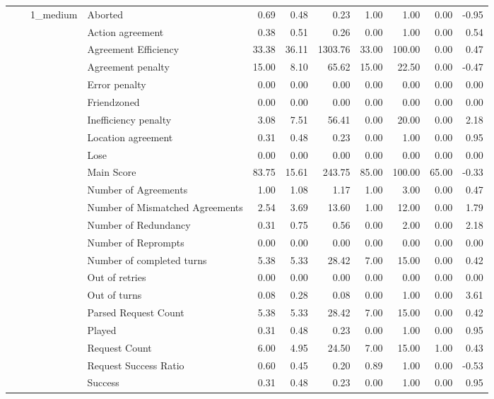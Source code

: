 \begin{tabular}{llllrrrrrrr}
\cline{3-11}
 &  & \multirow[t]{27}{*}{1_medium} & Aborted & 0.69 & 0.48 & 0.23 & 1.00 & 1.00 & 0.00 & -0.95 \\
 &  &  & Action agreement & 0.38 & 0.51 & 0.26 & 0.00 & 1.00 & 0.00 & 0.54 \\
 &  &  & Agreement Efficiency & 33.38 & 36.11 & 1303.76 & 33.00 & 100.00 & 0.00 & 0.47 \\
 &  &  & Agreement penalty & 15.00 & 8.10 & 65.62 & 15.00 & 22.50 & 0.00 & -0.47 \\
 &  &  & Error penalty & 0.00 & 0.00 & 0.00 & 0.00 & 0.00 & 0.00 & 0.00 \\
 &  &  & Friendzoned & 0.00 & 0.00 & 0.00 & 0.00 & 0.00 & 0.00 & 0.00 \\
 &  &  & Inefficiency penalty & 3.08 & 7.51 & 56.41 & 0.00 & 20.00 & 0.00 & 2.18 \\
 &  &  & Location agreement & 0.31 & 0.48 & 0.23 & 0.00 & 1.00 & 0.00 & 0.95 \\
 &  &  & Lose & 0.00 & 0.00 & 0.00 & 0.00 & 0.00 & 0.00 & 0.00 \\
 &  &  & Main Score & 83.75 & 15.61 & 243.75 & 85.00 & 100.00 & 65.00 & -0.33 \\
 &  &  & Number of Agreements & 1.00 & 1.08 & 1.17 & 1.00 & 3.00 & 0.00 & 0.47 \\
 &  &  & Number of Mismatched Agreements & 2.54 & 3.69 & 13.60 & 1.00 & 12.00 & 0.00 & 1.79 \\
 &  &  & Number of Redundancy & 0.31 & 0.75 & 0.56 & 0.00 & 2.00 & 0.00 & 2.18 \\
 &  &  & Number of Reprompts & 0.00 & 0.00 & 0.00 & 0.00 & 0.00 & 0.00 & 0.00 \\
 &  &  & Number of completed turns & 5.38 & 5.33 & 28.42 & 7.00 & 15.00 & 0.00 & 0.42 \\
 &  &  & Out of retries & 0.00 & 0.00 & 0.00 & 0.00 & 0.00 & 0.00 & 0.00 \\
 &  &  & Out of turns & 0.08 & 0.28 & 0.08 & 0.00 & 1.00 & 0.00 & 3.61 \\
 &  &  & Parsed Request Count & 5.38 & 5.33 & 28.42 & 7.00 & 15.00 & 0.00 & 0.42 \\
 &  &  & Played & 0.31 & 0.48 & 0.23 & 0.00 & 1.00 & 0.00 & 0.95 \\
 &  &  & Request Count & 6.00 & 4.95 & 24.50 & 7.00 & 15.00 & 1.00 & 0.43 \\
 &  &  & Request Success Ratio & 0.60 & 0.45 & 0.20 & 0.89 & 1.00 & 0.00 & -0.53 \\
 &  &  & Success & 0.31 & 0.48 & 0.23 & 0.00 & 1.00 & 0.00 & 0.95 \\

\end{tabular}
